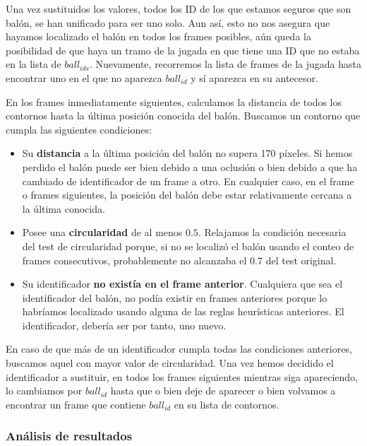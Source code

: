 Una vez sustituidos los valores, todos los ID de los que estamos seguros que son balón, se han unificado para ser uno solo. Aun así, esto no nos asegura que hayamos localizado el balón en todos los frames posibles, aún queda la posibilidad de que haya un tramo de la jugada en que tiene una ID que no estaba en la lista de $ball_{ids}$. Nuevamente, recorremos la lista de frames de la jugada hasta encontrar uno en el que no aparezca $ball_{id}$ y sí aparezca en su antecesor. 

En los frames inmediatamente siguientes, calculamos la distancia de todos los contornos hasta la última posición conocida del balón. Buscamos un contorno que cumpla las siguientes condiciones:
\begin{itemize}
  \item Su \textbf{distancia} a la última posición del balón no supera 170 píxeles. Si hemos perdido el balón puede ser bien debido a una oclusión o bien debido a que ha cambiado de identificador de un frame a otro. En cualquier caso, en el frame o frames siguientes, la posición del balón debe estar relativamente cercana a la última conocida.
  \item Posee una \textbf{circularidad} de al menos $0.5$. Relajamos la condición necesaria del test de circularidad porque, si no se localizó el balón usando el conteo de frames consecutivos, probablemente no alcanzaba el $0.7$ del test original.
  \item  Su identificador \textbf{no existía en el frame anterior}. Cualquiera que sea el identificador del balón, no podía existir en frames anteriores porque lo habríamos localizado usando alguna de las reglas heurísticas anteriores. El identificador, debería ser por tanto, uno nuevo.
\end{itemize}

En caso de que más de un identificador cumpla todas las condiciones anteriores, buscamos aquel con mayor valor de circularidad. Una vez hemos decidido el identificador a sustituir, en todos los frames siguientes mientras siga apareciendo, lo cambiamos por $ball_{id}$ hasta que o bien deje de aparecer o bien volvamos a encontrar un frame que contiene $ball_{id}$ en su lista de contornos. 

\subsubsection*{Análisis de resultados}

